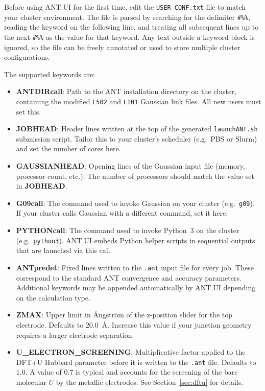 \documentclass[12pt]{article}
\begin{document}
Before using ANT.UI for the first time, edit the \texttt{USER\_CONF.txt} file to match your cluster environment. The file is parsed by searching for the delimiter \texttt{\#\%\%}, reading the keyword on the following line, and treating all subsequent lines up to the next \texttt{\#\%\%} as the value for that keyword. Any text outside a keyword block is ignored, so the file can be freely annotated or used to store multiple cluster configurations.

The supported keywords are:

\begin{itemize}
    \item \textbf{ANTDIRcall}: Path to the ANT installation directory on the cluster, containing the modified \texttt{L502} and \texttt{L101} Gaussian link files. All new users must set this.

    \item \textbf{JOBHEAD}: Header lines written at the top of the generated \texttt{launchANT.sh} submission script. Tailor this to your cluster's scheduler (e.g.\ PBS or Slurm) and set the number of cores here.

    \item \textbf{GAUSSIANHEAD}: Opening lines of the Gaussian input file (memory, processor count, etc.). The number of processors should match the value set in \textbf{JOBHEAD}.

    \item \textbf{G09call}: The command used to invoke Gaussian on your cluster (e.g.\ \texttt{g09}). If your cluster calls Gaussian with a different command, set it here.

    \item \textbf{PYTHONcall}: The command used to invoke Python~3 on the cluster (e.g.\ \texttt{python3}). ANT.UI embeds Python helper scripts in sequential outputs that are launched via this call.

    \item \textbf{ANTpredet}: Fixed lines written to the \texttt{.ant} input file for every job. These correspond to the standard ANT convergence and accuracy parameters. Additional keywords may be appended automatically by ANT.UI depending on the calculation type.

    \item \textbf{ZMAX}: Upper limit in Ångström of the z-position slider for the top electrode. Defaults to $20.0$~Å. Increase this value if your junction geometry requires a larger electrode separation.

    \item \textbf{U\_ELECTRON\_SCREENING}: Multiplicative factor applied to the DFT+U Hubbard parameter before it is written to the \texttt{.ant} file. Defaults to $1.0$. A value of $0.7$ is typical and accounts for the screening of the bare molecular $U$ by the metallic electrodes. See Section~\ref{sec:dftu} for details.
\end{itemize}
\end{document}
